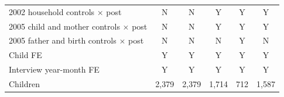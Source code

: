\documentclass[12pt]{article}
\begin{document}
\begin{table}[!htbp]
{\begin{tabular}{l*{5}{c}}
2002 household controls \ensuremath{\times} post&           N         &           N         &           Y         &           Y         &           Y         \\
2005 child and mother controls \ensuremath{\times} post&           N         &           N         &           Y         &           Y         &           Y         \\
2005 father and birth controls \ensuremath{\times} post&           N         &           N         &           N         &           Y         &           N         \\
Child FE    &           Y         &           Y         &           Y         &           Y         &           Y         \\
Interview year-month FE&           Y         &           Y         &           Y         &           Y         &           Y         \\
Children    &       2,379         &       2,379         &       1,714         &         712         &       1,587         \\
\bottomrule
\end{tabular}}%
\makebox[\textwidth][c]{\usebox{\tblbox}}%
\par\vspace{4pt}

\end{table}
\end{document}
